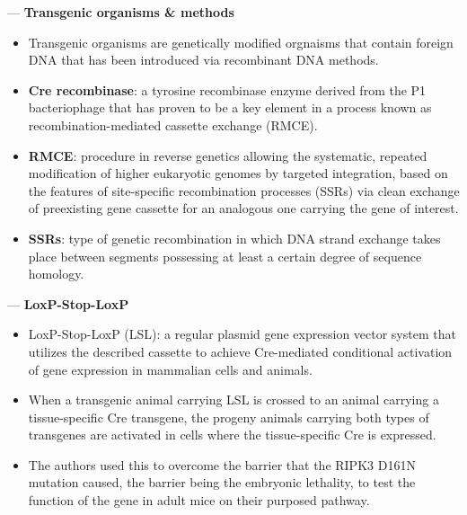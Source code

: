 \documentclass[basic,plain]{inVerba-notes}
\begin{document}
 --- \textbf{Transgenic organisms \& methods}
\begin{itemize}
  \item Transgenic organisms are genetically modified orgnaisms that contain foreign DNA that has been introduced via recombinant DNA methods. 
  \item \textbf{Cre recombinase}: a tyrosine recombinase enzyme derived from the P1 bacteriophage that has proven to be a key element in a process known as recombination-mediated cassette exchange (RMCE).
  \item \textbf{RMCE}:  procedure in reverse genetics allowing the systematic, repeated modification of higher eukaryotic genomes by targeted integration, based on the features of site-specific recombination processes (SSRs) via clean exchange of preexisting gene cassette for an analogous one carrying the gene of interest.
  \item \textbf{SSRs}: type of genetic recombination in which DNA strand exchange takes place between segments possessing at least a certain degree of sequence homology.
\end{itemize}

\medskip

 --- \textbf{LoxP-Stop-LoxP}

\begin{itemize}
  \item LoxP-Stop-LoxP (LSL): a regular plasmid gene expression vector system that utilizes the described cassette to achieve Cre-mediated conditional activation of gene expression in mammalian cells and animals.
  \item When a transgenic animal carrying LSL is crossed to an animal carrying a tissue-specific Cre transgene, the progeny animals carrying both types of transgenes are activated in cells where the tissue-specific Cre is expressed.
  \item The authors used this to overcome the barrier that the RIPK3 D161N mutation caused, the barrier being the embryonic lethality, to test the function of the gene in adult mice on their purposed pathway.
\end{itemize}

\medskip


\begin{center}
\end{center}
\end{document}
